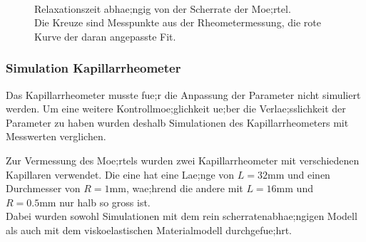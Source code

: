 \begin{figure}
    \centering
     \\
    \caption{Relaxationszeit abhae;ngig von der Scherrate der Moe;rtel.\\Die Kreuze sind Messpunkte aus der Rheometermessung, die rote Kurve der daran angepasste Fit.}
    \label{fig:shearLambda}
\end{figure}
%
\subsubsection{Simulation Kapillarrheometer}
Das Kapillarrheometer musste fue;r die Anpassung der Parameter nicht simuliert werden. Um eine weitere Kontrollmoe;glichkeit ue;ber die Verlae;sslichkeit der Parameter zu haben wurden deshalb Simulationen des Kapillarrheometers mit Messwerten verglichen.

Zur Vermessung des Moe;rtels wurden zwei Kapillarrheometer mit verschiedenen Kapillaren verwendet. Die eine hat eine Lae;nge von $L=32\mbox{mm}$ und einen Durchmesser von $R=1\mbox{mm}$, wae;hrend die andere mit $L=16\mbox{mm}$ und $R=0.5\mbox{mm}$ nur halb so gross ist.\\
Dabei wurden sowohl Simulationen mit dem rein scherratenabhae;ngigen Modell als auch mit dem viskoelastischen Materialmodell durchgefue;hrt.

